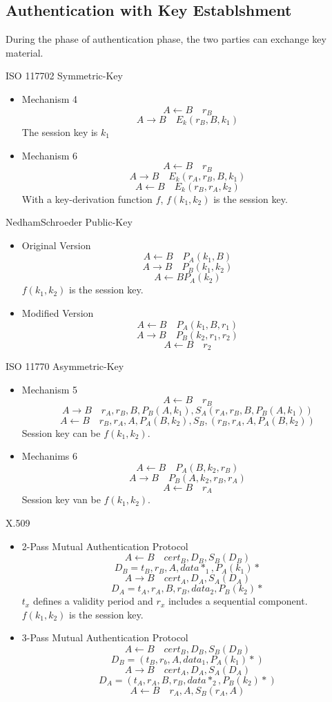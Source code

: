 \subsection{Authentication with Key Establshment}
During the phase of authentication phase, the two parties can exchange key
material.

ISO 11770\text{-}2 Symmetric-Key
\begin{itemize}
    \item Mechanism 4
    $$ A \leftarrow B \quad r_B $$
    $$ A \rightarrow B \quad E_k(r_B,B,k_1) $$
    The session key is $k_1$

    \item Mechanism 6
    $$ A \leftarrow B \quad r_B $$
    $$ A \rightarrow B \quad E_k(r_A,r_B,B,k_1) $$
    $$ A \leftarrow B \quad E_k(r_B,r_A,k_2) $$
    With a key-derivation function $f$, $f(k_1,k_2)$ is the session key.
\end{itemize}

Nedham\text{-}Schroeder Public-Key
\begin{itemize}
    \item Original Version
    $$ A \leftarrow B \quad P_A(k_1,B)  $$
    $$ A \rightarrow B \quad P_B(k_1,k_2) $$
    $$ A \leftarrow B P_A(k_2) $$
    $f(k_1,k_2)$ is the session key.
    \item Modified Version
    $$ A \leftarrow B \quad P_A(k_1,B,r_1) $$
    $$ A \rightarrow B \quad P_B(k_2,r_1,r_2) $$
    $$ A \leftarrow B \quad r_2 $$
\end{itemize}

ISO 11770\text{-} Asymmetric-Key
\begin{itemize}
    \item Mechanism 5
    $$ A \leftarrow B \quad r_B $$
    $$ A \rightarrow B \quad r_A,r_B,B,P_B(A,k_1),S_A(r_A,r_B,B,P_B(A,k_1))$$
    $$ A \leftarrow B \quad r_B,r_A,A,P_A(B,k_2),S_B,(r_B,r_A,A,P_A(B,k_2))$$
    Session key can be $f(k_1,k_2)$.
    \item Mechanims 6
    $$ A \leftarrow B \quad P_A(B,k_2,r_B) $$
    $$ A \rightarrow B \quad P_B(A,k_2,r_B,r_A) $$
    $$ A \leftarrow B \quad r_A $$
    Session key van be $f(k_1,k_2)$.
\end{itemize}
X.509
\begin{itemize}
    \item 2-Pass Mutual Authentication Protocol
    $$ A \leftarrow B \quad cert_B,D_B,S_B(D_B) $$
    $$ D_B = t_B,r_B,A,data*_1,P_A(k_1)* $$
    $$ A \rightarrow B \quad cert_A,D_A,S_A(D_A) $$
    $$ D_A = t_A,r_A,B,r_B,data_2,P_B(k_2)* $$
    $t_x$ defines a validity period and $r_x$ includes a sequential component.
    $f(k_1,k_2)$ is the session key.
    \item 3-Pass Mutual Authentication Protocol
    $$ A \leftarrow B \quad cert_B,D_B,S_B(D_B) $$
    $$ D_B = (t_B,r_b,A,data_1,P_A(k_1)*) $$
    $$ A \rightarrow B \quad cert_A,D_A,S_A(D_A) $$
    $$ D_A = (t_A,r_A,B,r_B,data*_2,P_B(k_2)*) $$
    $$ A \leftarrow B \quad r_A,A,S_B(r_A,A) $$
\end{itemize}

